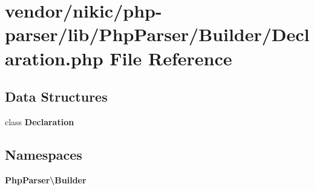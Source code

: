 \section{vendor/nikic/php-\/parser/lib/\+Php\+Parser/\+Builder/\+Declaration.php File Reference}
\label{_declaration_8php}
\subsection*{Data Structures}
\begin{DoxyCompactItemize}
\item 
class {\bf Declaration}
\end{DoxyCompactItemize}
\subsection*{Namespaces}
\begin{DoxyCompactItemize}
\item 
 {\bf Php\+Parser\textbackslash{}\+Builder}
\end{DoxyCompactItemize}
